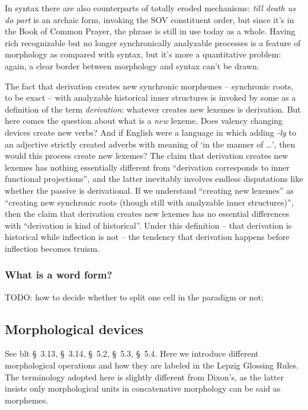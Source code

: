 \documentclass[UTF8, a4paper, oneside, scheme=plain]{ctexart}
\newcommand*{\citesec}[1]{\S~{#1}}
\newcommand*{\term}[1]{\emph{#1}}
\newcommand*{\corpus}[1]{\emph{#1}}
\newcommand*{\translate}[1]{`#1'}
\begin{document}
In syntax there are also counterparts of totally eroded mechanisms:
\corpus{till death us do part} is an archaic form,
invoking the SOV constituent order,
but since it's in the Book of Common Prayer,
the phrase is still in use today as a whole.
Having rich recognizable but no longer synchronically analyzable processes 
is a feature of morphology as compared with syntax,
but it's more a quantitative problem:
again, a clear border between morphology and syntax can't be drawn.

The fact that derivation creates new synchronic morphemes -- synchronic roots, to be exact
-- with analyzable historical inner structures 
is invoked by some as a definition of the term \term{derivation}:
whatever creates new lexemes is derivation.
But here comes the question about what is a \emph{new} lexeme.
Does valency changing devices create new verbs?
And if English were a language 
in which adding \corpus{-ly} to an adjective
strictly created adverbs with meaning of \translate{in the manner of \dots},
then would this process create new lexemes?
The claim that derivation creates new lexemes 
has nothing essentially different from 
``derivation corresponds to inner functional projections'',
and the latter inevitably involves endless disputations like whether the passive is derivational.
If we understand ``creating new lexemes'' 
as ``creating new synchronic roots (though still with analyzable inner structures)'',
then the claim that derivation creates new lexemes
has no essential differences with ``derivation is kind of historical''.
Under this definition -- 
that derivation is historical while inflection is not --
the tendency that derivation happens before inflection becomes truism.

\subsubsection{What is a word form?}

TODO: how to decide whether to split one cell in the paradigm or not;

\subsection{Morphological devices}

See \ac{blt} \citesec{3.13}, \citesec{3.14}, \citesec{5.2}, \citesec{5.3}, \citesec{5.4}.
Here we introduce different morphological operations and how they are labeled in the Lepzig Glossing Rules. 
The terminology adopted here is slightly different from Dixon's, 
as the latter insists only morphological units in concatenative morphology can be said as morphemes.
\end{document}
